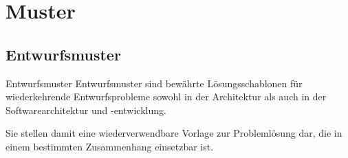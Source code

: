 \section{Muster}

\subsection{Entwurfsmuster}

\begin{defi}{Entwurfsmuster}
    Entwurfsmuster sind bewährte Lösungsschablonen für wiederkehrende Entwurfsprobleme sowohl in der Architektur als auch in der Softwarearchitektur und -entwicklung.

    Sie stellen damit eine wiederverwendbare Vorlage zur Problemlösung dar, die in einem bestimmten Zusammenhang einsetzbar ist.


\end{defi}
